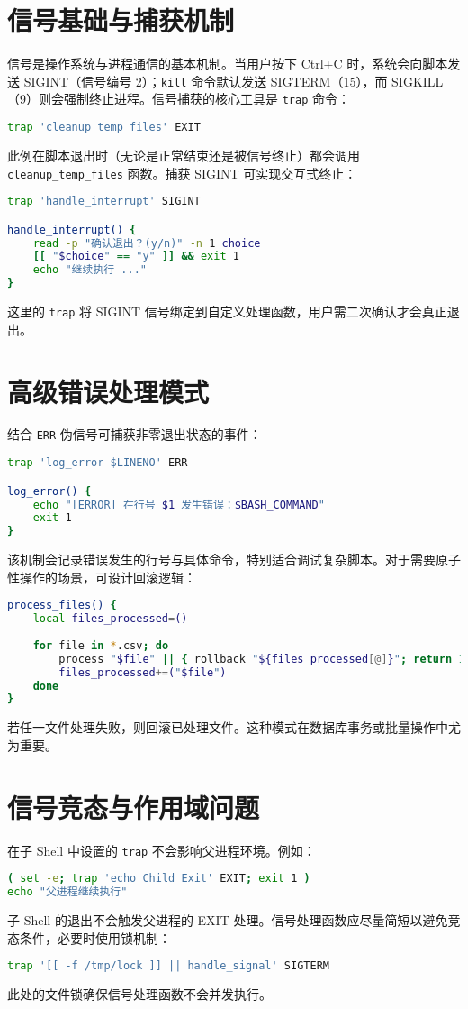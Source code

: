 \chapter{信号基础与捕获机制}
信号是操作系统与进程通信的基本机制。当用户按下 Ctrl+C 时，系统会向脚本发送 SIGINT（信号编号 2）；\verb!kill! 命令默认发送 SIGTERM（15），而 SIGKILL（9）则会强制终止进程。信号捕获的核心工具是 \verb!trap! 命令：\par
\begin{lstlisting}[language=bash]
trap 'cleanup_temp_files' EXIT
\end{lstlisting}
此例在脚本退出时（无论是正常结束还是被信号终止）都会调用 \verb!cleanup_temp_files! 函数。捕获 SIGINT 可实现交互式终止：\par
\begin{lstlisting}[language=bash]
trap 'handle_interrupt' SIGINT

handle_interrupt() {
    read -p "确认退出？(y/n)" -n 1 choice
    [[ "$choice" == "y" ]] && exit 1
    echo "继续执行 ..."
}
\end{lstlisting}
这里的 \verb!trap! 将 SIGINT 信号绑定到自定义处理函数，用户需二次确认才会真正退出。\par
\chapter{高级错误处理模式}
结合 \verb!ERR! 伪信号可捕获非零退出状态的事件：\par
\begin{lstlisting}[language=bash]
trap 'log_error $LINENO' ERR

log_error() {
    echo "[ERROR] 在行号 $1 发生错误：$BASH_COMMAND"
    exit 1
}
\end{lstlisting}
该机制会记录错误发生的行号与具体命令，特别适合调试复杂脚本。对于需要原子性操作的场景，可设计回滚逻辑：\par
\begin{lstlisting}[language=bash]
process_files() {
    local files_processed=()
    
    for file in *.csv; do
        process "$file" || { rollback "${files_processed[@]}"; return 1; }
        files_processed+=("$file")
    done
}
\end{lstlisting}
若任一文件处理失败，则回滚已处理文件。这种模式在数据库事务或批量操作中尤为重要。\par
\chapter{信号竞态与作用域问题}
在子 Shell 中设置的 \verb!trap! 不会影响父进程环境。例如：\par
\begin{lstlisting}[language=bash]
( set -e; trap 'echo Child Exit' EXIT; exit 1 )
echo "父进程继续执行"
\end{lstlisting}
子 Shell 的退出不会触发父进程的 EXIT 处理。信号处理函数应尽量简短以避免竞态条件，必要时使用锁机制：\par
\begin{lstlisting}[language=bash]
trap '[[ -f /tmp/lock ]] || handle_signal' SIGTERM
\end{lstlisting}
此处的文件锁确保信号处理函数不会并发执行。\par
